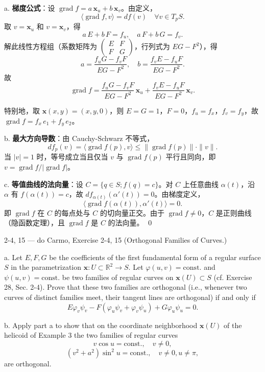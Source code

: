 \begin{solution}
a. \textbf{梯度公式}：设 $\operatorname{grad} f = a\, \mathbf{x}_u + b\, \mathbf{x}_v$。由定义，
\[
\langle \operatorname{grad} f, v\rangle = df(v)\quad \forall v \in T_pS.
\]
取 $v = \mathbf{x}_u$ 和 $v = \mathbf{x}_v$，得
\[
a\, E + b\, F = f_u,\quad a\, F + b\, G = f_v.
\]
解此线性方程组（系数矩阵为 $\begin{pmatrix}E & F\\ F & G\end{pmatrix}$，行列式为 $EG - F^2$），得
\[
a = \frac{f_u G - f_v F}{EG - F^2},\quad b = \frac{f_v E - f_u F}{EG - F^2}.
\]
故
\[
\operatorname{grad} f = \frac{f_u G - f_v F}{EG - F^2}\,\mathbf{x}_u + \frac{f_v E - f_u F}{EG - F^2}\,\mathbf{x}_v.
\]

特别地，取 $\mathbf{x}(x,y) = (x,y,0)$，则 $E = G = 1$，$F = 0$，$f_u = f_x$，$f_v = f_y$，故 $\operatorname{grad} f = f_x\, e_1 + f_y\, e_2$。

b. \textbf{最大方向导数}：由 Cauchy-Schwarz 不等式，
\[
df_p(v) = \langle \operatorname{grad} f(p), v\rangle \leq \|\operatorname{grad} f(p)\| \cdot \|v\|.
\]
当 $|v| = 1$ 时，等号成立当且仅当 $v$ 与 $\operatorname{grad} f(p)$ 平行且同向，即 $v = \operatorname{grad} f / |\operatorname{grad} f|$。

c. \textbf{等值曲线的法向量}：设 $C = \{q \in S; f(q) = c\}$。对 $C$ 上任意曲线 $\alpha(t)$，沿 $\alpha$ 有 $f(\alpha(t)) = c$，故 $df_{\alpha(t)}(\alpha'(t)) = 0$。由梯度定义，
\[
\langle \operatorname{grad} f(\alpha(t)), \alpha'(t)\rangle = 0.
\]
即 $\operatorname{grad} f$ 在 $C$ 的每点处与 $C$ 的切向量正交。由于 $\operatorname{grad} f \neq 0$，$C$ 是正则曲线（隐函数定理），且 $\operatorname{grad} f$ 是 $C$ 的法向量。
\qed
\end{solution}

\begin{exercise}{2-4, 15 — do Carmo, Exercise 2-4, 15}
(Orthogonal Families of Curves.)

a. Let $E, F, G$ be the coefficients of the first fundamental form of a regular surface $S$ in the parametrization $\mathbf{x}: U \subset \mathbb{R}^2 \to S$. Let $\varphi(u, v) = \mathrm{const.}$ and $\psi(u, v) = \mathrm{const.}$ be two families of regular curves on $\mathbf{x}(U) \subset S$ (cf. Exercise 28, Sec. 2-4). Prove that these two families are orthogonal (i.e., whenever two curves of distinct families meet, their tangent lines are orthogonal) if and only if
\[
E \varphi_v \psi_v - F(\varphi_u \psi_v + \varphi_v \psi_u) + G \varphi_u \psi_u = 0.
\]

b. Apply part a to show that on the coordinate neighborhood $\mathbf{x}(U)$ of the helicoid of Example 3 the two families of regular curves
\[
v \cos u = \mathrm{const.}, \quad v \neq 0,
\]
\[
(v^2 + a^2) \sin^2 u = \mathrm{const.}, \quad v \neq 0, u \neq \pi,
\]
are orthogonal.
\end{exercise}

